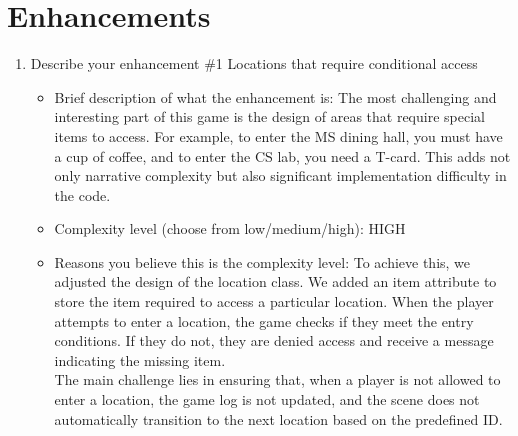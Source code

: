 \documentclass[11pt]{article}
\begin{document}
\section*{Enhancements}
\begin{enumerate}
    \item Describe your enhancement \#1 Locations that require conditional access
    \begin{itemize}
        \item Brief description of what the enhancement is: The most challenging and interesting part of this game is the design of areas that require special items to access. For example, to enter the MS dining hall, you must have a cup of coffee, and to enter the CS lab, you need a T-card. This adds not only narrative complexity but also significant implementation difficulty in the code.\\
        \item Complexity level (choose from low/medium/high): HIGH
        \item Reasons you believe this is the complexity level: To achieve this, we adjusted the design of the location class. We added an item attribute to store the item required to access a particular location. When the player attempts to enter a location, the game checks if they meet the entry conditions. If they do not, they are denied access and receive a message indicating the missing item.\\
        The main challenge lies in ensuring that, when a player is not allowed to enter a location, the game log is not updated, and the scene does not automatically transition to the next location based on the predefined ID.
    \end{itemize}


\end{enumerate}
\end{document}
